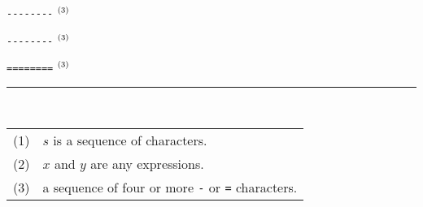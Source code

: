 \documentclass[fleqn,leqno]{article}
\newcommand{\notemark}[1]{$^{\mbox{\tiny(#1)}}$}
\begin{document}
\verb|--------| \notemark{3} \\[.2em]
\hspace*{\boxsep}\begin{minipage}{.15\textwidth}
\begin{nomodule}
\midbar
\end{nomodule}
\end{minipage}\hspace*{\boxsep}
\verb|--------| \notemark{3} 
\hspace*{\boxsep}\begin{minipage}{.15\textwidth}
\vspace{1ex}
\begin{nomodule}
\bottombar
\end{nomodule}
\end{minipage}\hspace*{\boxsep}
\verb|========| \notemark{3} 
%

%
\rule{.2\textwidth}{.4pt}\\
{\footnotesize
\begin{tabular}[t]{@{}l@{\ }l}
  (1)& $s$ is a sequence of characters.  
\\[.1em]
  (2)& $x$ and $y$ are any expressions.\\[.1em]
  (3)& a sequence of four or more \verb|-| or \verb|=| characters.
\end{tabular}}

\end{document}
